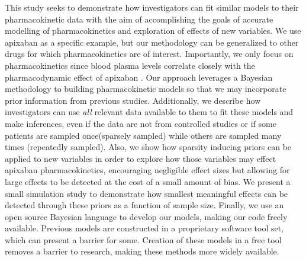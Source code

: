 This study seeks to demonstrate how investigators can fit similar models to their pharmacokinetic data with the aim of accomplishing the goals of accurate modelling of pharmacokinetics and exploration of effects of new variables.  We use apixaban as a specific example, but our methodology can be generalized to other drugs for which pharmacokinetics are of interest.  Importantly, we only focus on pharmacokinetics since blood plasma levels correlate closely with the pharmacodynamic effect of apixaban \cite{byon2019apixaban, upreti2013effect, frost2013safety,frost2013apixaban}. Our approach leverages a Bayesian methodology to building pharmacokinetic models so that we may incorporate prior information from previous studies. Additionally, we describe how investigators can use \textit{all} relevant data available to them to fit these models and make inferences, even if the data are not from controlled studies or if some patients are sampled once(sparsely sampled) while others are sampled many times (repeatedly sampled).  Also, we show how sparsity inducing priors can be applied to new variables in order to explore how those variables may effect apixaban pharmacokinetics, encouraging negligible effect sizes but allowing for large effects to be detected at the cost of a small amount of bias. We present a small simulation study to demonstrate how smallest meaningful effects can be detected through these priors as a function of sample size. Finally, we use an open source Bayesian language to develop our models, making our code freely available.  Previous models are constructed in a proprietary software tool set, which can present a barrier for some. Creation of these models in a free tool removes a barrier to research, making these methods more widely available.
